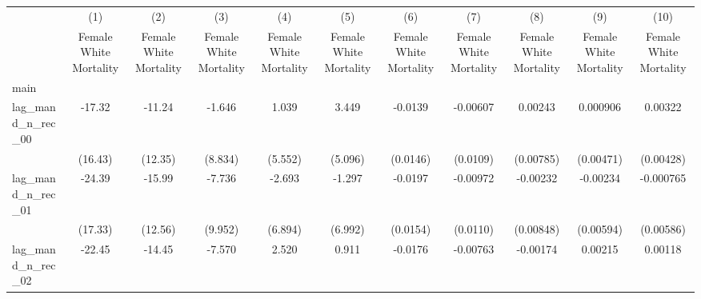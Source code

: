 {
\def\sym#1{\ifmmode^{#1}\else\(^{#1}\)\fi}
\begin{longtable}{l*{10}{c}}
\hline\hline\endfirsthead\hline\endhead\hline\endfoot\endlastfoot
                    &\multicolumn{1}{c}{(1)}&\multicolumn{1}{c}{(2)}&\multicolumn{1}{c}{(3)}&\multicolumn{1}{c}{(4)}&\multicolumn{1}{c}{(5)}&\multicolumn{1}{c}{(6)}&\multicolumn{1}{c}{(7)}&\multicolumn{1}{c}{(8)}&\multicolumn{1}{c}{(9)}&\multicolumn{1}{c}{(10)}\\
                    &\multicolumn{1}{c}{Female White Mortality}&\multicolumn{1}{c}{Female White Mortality}&\multicolumn{1}{c}{Female White Mortality}&\multicolumn{1}{c}{Female White Mortality}&\multicolumn{1}{c}{Female White Mortality}&\multicolumn{1}{c}{Female White Mortality}&\multicolumn{1}{c}{Female White Mortality}&\multicolumn{1}{c}{Female White Mortality}&\multicolumn{1}{c}{Female White Mortality}&\multicolumn{1}{c}{Female White Mortality}\\
\hline
main                &                     &                     &                     &                     &                     &                     &                     &                     &                     &                     \\
lag\_mand\_n\_rec\_00   &      -17.32         &      -11.24         &      -1.646         &       1.039         &       3.449         &     -0.0139         &    -0.00607         &     0.00243         &    0.000906         &     0.00322         \\
                    &     (16.43)         &     (12.35)         &     (8.834)         &     (5.552)         &     (5.096)         &    (0.0146)         &    (0.0109)         &   (0.00785)         &   (0.00471)         &   (0.00428)         \\
[1em]
lag\_mand\_n\_rec\_01   &      -24.39         &      -15.99         &      -7.736         &      -2.693         &      -1.297         &     -0.0197         &    -0.00972         &    -0.00232         &    -0.00234         &   -0.000765         \\
                    &     (17.33)         &     (12.56)         &     (9.952)         &     (6.894)         &     (6.992)         &    (0.0154)         &    (0.0110)         &   (0.00848)         &   (0.00594)         &   (0.00586)         \\
[1em]
lag\_mand\_n\_rec\_02   &      -22.45         &      -14.45         &      -7.570         &       2.520         &       0.911         &     -0.0176         &    -0.00763         &    -0.00174         &     0.00215         &     0.00118         \\

\end{longtable}}
